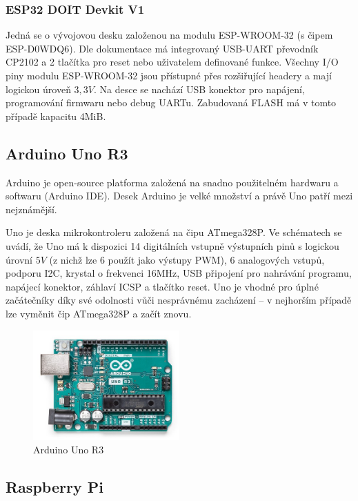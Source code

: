 \subsubsection{ESP32 DOIT Devkit V1}
Jedná se o vývojovou desku založenou na modulu ESP-WROOM-32 (s čipem ESP-D0WDQ6). Dle dokumentace \cite{espDevkit} má integrovaný USB-UART převodník CP2102 a 2 tlačítka pro reset nebo uživatelem definované funkce. Všechny I/O piny modulu ESP-WROOM-32 jsou přístupné přes rozšiřující headery a mají logickou úroveň $3,3V$. Na desce se nachází USB konektor pro napájení, programování firmwaru nebo debug UARTu. Zabudovaná FLASH má v tomto případě kapacitu 4MiB.


\subsection*{Arduino Uno R3}
Arduino je open-source platforma založená na snadno použitelném hardwaru a softwaru (Arduino IDE). Desek Arduino je velké množství a právě Uno patří mezi nejznámější.

Uno je deska mikrokontroleru založená na čipu ATmega328P. Ve schématech \cite{arduinoUno} se uvádí, že Uno má k dispozici 14 digitálních vstupně výstupních pinů s logickou úrovní $5V$ (z nichž lze 6 použít jako výstupy PWM), 6 analogových vstupů, podporu I2C, krystal o frekvenci 16MHz, USB připojení pro nahrávání programu, napájecí konektor, záhlaví ICSP a tlačítko reset. Uno je vhodné pro úplné začátečníky díky své odolnosti vůči nesprávnému zacházení -- v nejhorším případě lze vyměnit čip ATmega328P a začít znovu.

\begin{figure}[hbt]
	\centering
	\includegraphics[width=0.5\textwidth]{obrazky-figures/arduino.jpg}
	\caption[arduino]{Arduino Uno R3\footnotemark}
	\label{uno}
\end{figure}



\subsection*{Raspberry Pi}

